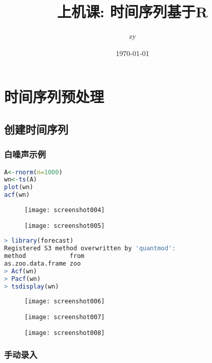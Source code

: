 \documentclass[11pt,a4paper,oneside]{book}
\title{\huge 上机课: 时间序列基于R }
\author{zy}
\date{\today}
\begin{document}
\maketitle
\tableofcontents  %
\part{时间序列预处理}
\chapter{创建时间序列}
\section{白噪声示例}
\begin{lstlisting}[language=r]
A<-rnorm(n=1000)
wn<-ts(A)
plot(wn)
acf(wn)
\end{lstlisting}
\begin{figure}[H]
	\centering
	\texttt{[image: screenshot004]}
	\caption{}
	\label{fig:screenshot004}
\end{figure}
\begin{figure}[H]
	\centering
	\texttt{[image: screenshot005]}
	\caption{}
	\label{fig:screenshot005}
\end{figure}
\begin{lstlisting}[language=r]
> library(forecast)
Registered S3 method overwritten by 'quantmod':
method            from
as.zoo.data.frame zoo 
> Acf(wn)
> Pacf(wn)
> tsdisplay(wn)
\end{lstlisting}
\begin{figure}[H]
	\centering
	\texttt{[image: screenshot006]}
	\caption{}
	\label{fig:screenshot006}
\end{figure}
\begin{figure}[H]
	\centering
	\texttt{[image: screenshot007]}
	\caption{}
	\label{fig:screenshot007}
\end{figure}
\begin{figure}[H]
	\centering
	\texttt{[image: screenshot008]}
	\caption{}
	\label{fig:screenshot008}
\end{figure}


\section{手动录入}
\end{document}
